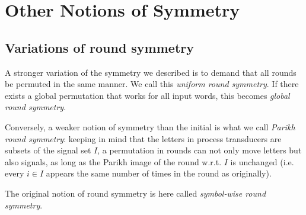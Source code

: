 \chapter{Other Notions of Symmetry}
\label{chap:other_notions}

\section{Variations of round symmetry}

A stronger variation of the symmetry we described is to demand that all rounds be permuted in the same manner. We call this \emph{uniform round symmetry}. If there exists a global permutation that works for all input words, this becomes \emph{global round symmetry}.

Conversely, a weaker notion of symmetry than the initial is what we call \emph{Parikh round symmetry}: keeping in mind that the letters in process transducers are subsets of the signal set $I$, a permutation in rounds can not only move letters but also signals, as long as the Parikh image of the round w.r.t.\! $I$ is unchanged (i.e. every $i\in I$ appears the same number of times in the round as originally).

The original notion of round symmetry is here called \emph{symbol-wise round symmetry}.


